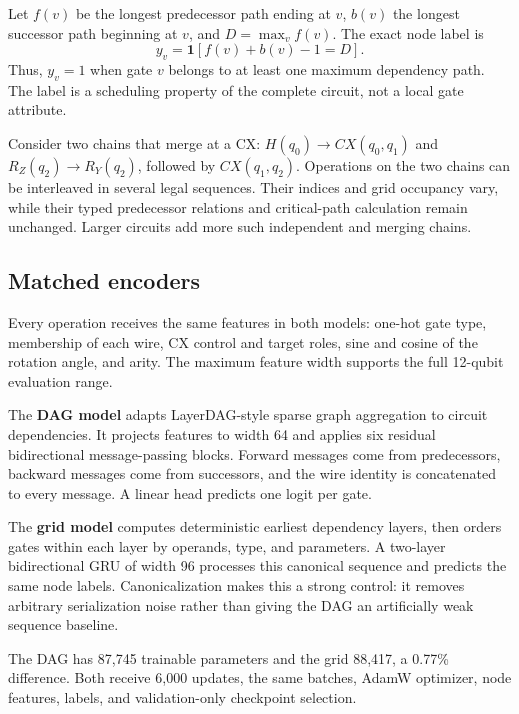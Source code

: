 \documentclass[10pt,twocolumn]{article}
\begin{document}
Let $f(v)$ be the longest predecessor path ending at $v$, $b(v)$ the longest successor path beginning at $v$, and $D=\max_v f(v)$. The exact node label is
\begin{equation}
 y_v=\mathbf{1}\!\left[f(v)+b(v)-1=D\right].
\end{equation}
Thus, $y_v=1$ when gate $v$ belongs to at least one maximum dependency path. The label is a scheduling property of the complete circuit, not a local gate attribute.

Consider two chains that merge at a CX: $H(q_0)\rightarrow CX(q_0,q_1)$ and $R_Z(q_2)\rightarrow R_Y(q_2)$, followed by $CX(q_1,q_2)$. Operations on the two chains can be interleaved in several legal sequences. Their indices and grid occupancy vary, while their typed predecessor relations and critical-path calculation remain unchanged. Larger circuits add more such independent and merging chains.

\subsection{Matched encoders}

Every operation receives the same features in both models: one-hot gate type, membership of each wire, CX control and target roles, sine and cosine of the rotation angle, and arity. The maximum feature width supports the full 12-qubit evaluation range.

The \textbf{DAG model} adapts LayerDAG-style sparse graph aggregation \cite{li2025layerdag} to circuit dependencies. It projects features to width 64 and applies six residual bidirectional message-passing blocks. Forward messages come from predecessors, backward messages come from successors, and the wire identity is concatenated to every message. A linear head predicts one logit per gate.

The \textbf{grid model} computes deterministic earliest dependency layers, then orders gates within each layer by operands, type, and parameters. A two-layer bidirectional GRU of width 96 processes this canonical sequence and predicts the same node labels. Canonicalization makes this a strong control: it removes arbitrary serialization noise rather than giving the DAG an artificially weak sequence baseline.

The DAG has 87,745 trainable parameters and the grid 88,417, a 0.77\% difference. Both receive 6,000 updates, the same batches, AdamW optimizer, node features, labels, and validation-only checkpoint selection.
\end{document}
